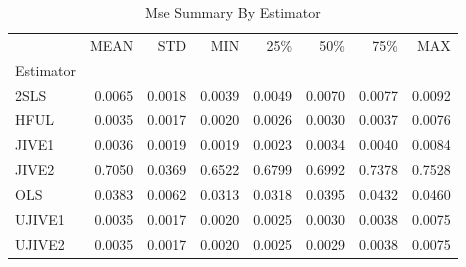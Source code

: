\begin{table}[ht]
\centering
\caption{Mse Summary By Estimator}
\begin{tabular}{lrrrrrrr}
\toprule
 & MEAN & STD & MIN & 25\% & 50\% & 75\% & MAX \\
Estimator &  &  &  &  &  &  &  \\
\midrule
2SLS & 0.0065 & 0.0018 & 0.0039 & 0.0049 & 0.0070 & 0.0077 & 0.0092 \\
HFUL & 0.0035 & 0.0017 & 0.0020 & 0.0026 & 0.0030 & 0.0037 & 0.0076 \\
JIVE1 & 0.0036 & 0.0019 & 0.0019 & 0.0023 & 0.0034 & 0.0040 & 0.0084 \\
JIVE2 & 0.7050 & 0.0369 & 0.6522 & 0.6799 & 0.6992 & 0.7378 & 0.7528 \\
OLS & 0.0383 & 0.0062 & 0.0313 & 0.0318 & 0.0395 & 0.0432 & 0.0460 \\
UJIVE1 & 0.0035 & 0.0017 & 0.0020 & 0.0025 & 0.0030 & 0.0038 & 0.0075 \\
UJIVE2 & 0.0035 & 0.0017 & 0.0020 & 0.0025 & 0.0029 & 0.0038 & 0.0075 \\
\bottomrule
\end{tabular}
\end{table}
